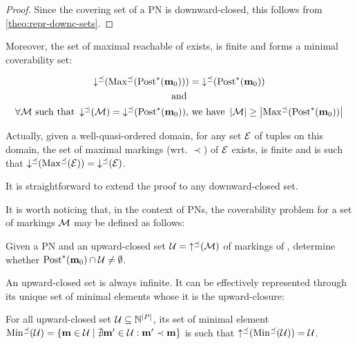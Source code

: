 \begin{proof}
  Since the covering set of a PN is downward-closed, this follows from \cref{theo:repr-downc-sets}.
\end{proof}

Moreover, the set of maximal reachable \omarks of \namePN exists, is finite and forms a minimal coverability set:


\begin{gather*}
\operatorname{\downarrow^\preceq}(\operatorname{Max^\preceq}(\operatorname{Post}^*_{{}}(\mathbf{m}_0))) = \operatorname{\downarrow^\preceq}(\operatorname{Post}^*_{{}}(\mathbf{m}_0)) \\*
\text{ and } \\*
\forall \mathcal{M} \text{ such that } \operatorname{\downarrow^\preceq}(\mathcal{M}) = \operatorname{\downarrow^\preceq}(\operatorname{Post}^*_{{}}(\mathbf{m}_0))\text{, we have } \left|\mathcal{M}\right| \geq \left|\operatorname{Max^\preceq}(\operatorname{Post}^*_{{}}(\mathbf{m}_0))\right|
\end{gather*}

Actually, given a well-quasi-ordered domain, for any set $\mathcal{E}$ of tuples on this domain, the set of maximal markings (wrt. $\prec$) of $\mathcal{E}$ exists, is finite and is such that $\operatorname{\downarrow^\preceq}(\operatorname{Max^\preceq}(\mathcal{E})) = \operatorname{\downarrow^\preceq}(\mathcal{E})$.


It is straightforward to extend the proof to any downward-closed set.

It is worth noticing that, in the context of \acp{PN}, the coverability problem for a set of markings $\mathcal{M}$ may be defined as follows:
\begin{defi}
  \label{defi:upclocovprblm}
  Given a \ac{PN} \namePN and an upward-closed set $\mathcal{U} = \operatorname{\uparrow^\preceq}(\mathcal{M})$ of markings of \namePN, determine whether $\operatorname{Post}^*_{{}}(\mathbf{m}_0) \cap \mathcal{U} \neq \emptyset$.
\end{defi}

\label{text:upward-closed-set-representation}
An upward-closed set is always infinite.
It can be effectively represented through its unique set of minimal elements whose it is the upward-closure:
\begin{lemm}
  \label{theo:upward-closed-set-representation}
  For all upward-closed set $\mathcal{U} \subseteq \mathbb{N}^{\left|P\right|}$, its set of minimal element $\operatorname{Min^\preceq}(\mathcal{U}) = \{\mathbf{m} \in \mathcal{U} \mid \nexists \mathbf{m}' \in \mathcal{U} : \mathbf{m}' \prec \mathbf{m}\}$ is such that $\operatorname{\uparrow^\preceq}(\operatorname{Min^\preceq}(\mathcal{U})) = \mathcal{U}$.
\end{lemm}

